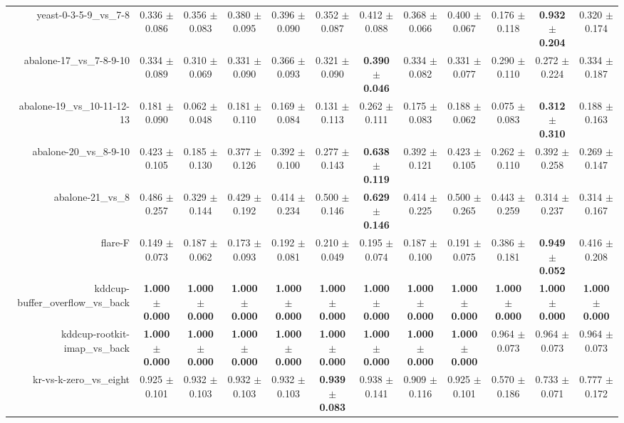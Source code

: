 \begin{table}[!ht]
{\begin{tabular}{r c c c c c c c c c c c}
yeast-0-3-5-9\_vs\_7-8 & 0.336 $\pm$ 0.086 & 0.356 $\pm$ 0.083 & 0.380 $\pm$ 0.095 & 0.396 $\pm$ 0.090 & 0.352 $\pm$ 0.087 & 0.412 $\pm$ 0.088 & 0.368 $\pm$ 0.066 & 0.400 $\pm$ 0.067 & 0.176 $\pm$ 0.118 & \textbf{0.932 $\pm$ 0.204} & 0.320 $\pm$ 0.174 \\
abalone-17\_vs\_7-8-9-10 & 0.334 $\pm$ 0.089 & 0.310 $\pm$ 0.069 & 0.331 $\pm$ 0.090 & 0.366 $\pm$ 0.093 & 0.321 $\pm$ 0.090 & \textbf{0.390 $\pm$ 0.046} & 0.334 $\pm$ 0.082 & 0.331 $\pm$ 0.077 & 0.290 $\pm$ 0.110 & 0.272 $\pm$ 0.224 & 0.334 $\pm$ 0.187 \\
abalone-19\_vs\_10-11-12-13 & 0.181 $\pm$ 0.090 & 0.062 $\pm$ 0.048 & 0.181 $\pm$ 0.110 & 0.169 $\pm$ 0.084 & 0.131 $\pm$ 0.113 & 0.262 $\pm$ 0.111 & 0.175 $\pm$ 0.083 & 0.188 $\pm$ 0.062 & 0.075 $\pm$ 0.083 & \textbf{0.312 $\pm$ 0.310} & 0.188 $\pm$ 0.163 \\
abalone-20\_vs\_8-9-10 & 0.423 $\pm$ 0.105 & 0.185 $\pm$ 0.130 & 0.377 $\pm$ 0.126 & 0.392 $\pm$ 0.100 & 0.277 $\pm$ 0.143 & \textbf{0.638 $\pm$ 0.119} & 0.392 $\pm$ 0.121 & 0.423 $\pm$ 0.105 & 0.262 $\pm$ 0.110 & 0.392 $\pm$ 0.258 & 0.269 $\pm$ 0.147 \\
abalone-21\_vs\_8 & 0.486 $\pm$ 0.257 & 0.329 $\pm$ 0.144 & 0.429 $\pm$ 0.192 & 0.414 $\pm$ 0.234 & 0.500 $\pm$ 0.146 & \textbf{0.629 $\pm$ 0.146} & 0.414 $\pm$ 0.225 & 0.500 $\pm$ 0.265 & 0.443 $\pm$ 0.259 & 0.314 $\pm$ 0.237 & 0.314 $\pm$ 0.167 \\
flare-F & 0.149 $\pm$ 0.073 & 0.187 $\pm$ 0.062 & 0.173 $\pm$ 0.093 & 0.192 $\pm$ 0.081 & 0.210 $\pm$ 0.049 & 0.195 $\pm$ 0.074 & 0.187 $\pm$ 0.100 & 0.191 $\pm$ 0.075 & 0.386 $\pm$ 0.181 & \textbf{0.949 $\pm$ 0.052} & 0.416 $\pm$ 0.208 \\
kddcup-buffer\_overflow\_vs\_back & \textbf{1.000 $\pm$ 0.000} & \textbf{1.000 $\pm$ 0.000} & \textbf{1.000 $\pm$ 0.000} & \textbf{1.000 $\pm$ 0.000} & \textbf{1.000 $\pm$ 0.000} & \textbf{1.000 $\pm$ 0.000} & \textbf{1.000 $\pm$ 0.000} & \textbf{1.000 $\pm$ 0.000} & \textbf{1.000 $\pm$ 0.000} & \textbf{1.000 $\pm$ 0.000} & \textbf{1.000 $\pm$ 0.000} \\
kddcup-rootkit-imap\_vs\_back & \textbf{1.000 $\pm$ 0.000} & \textbf{1.000 $\pm$ 0.000} & \textbf{1.000 $\pm$ 0.000} & \textbf{1.000 $\pm$ 0.000} & \textbf{1.000 $\pm$ 0.000} & \textbf{1.000 $\pm$ 0.000} & \textbf{1.000 $\pm$ 0.000} & \textbf{1.000 $\pm$ 0.000} & 0.964 $\pm$ 0.073 & 0.964 $\pm$ 0.073 & 0.964 $\pm$ 0.073 \\
kr-vs-k-zero\_vs\_eight & 0.925 $\pm$ 0.101 & 0.932 $\pm$ 0.103 & 0.932 $\pm$ 0.103 & 0.932 $\pm$ 0.103 & \textbf{0.939 $\pm$ 0.083} & 0.938 $\pm$ 0.141 & 0.909 $\pm$ 0.116 & 0.925 $\pm$ 0.101 & 0.570 $\pm$ 0.186 & 0.733 $\pm$ 0.071 & 0.777 $\pm$ 0.172 \\

\end{tabular}}
\end{table}
